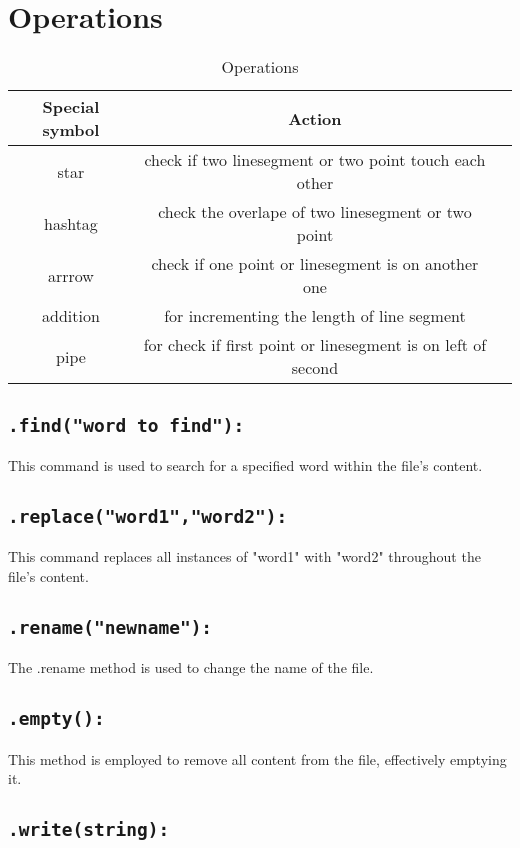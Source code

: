 \documentclass{article}
\begin{document}
\section{Operations}
\begin{table}[h!]
  \centering
  \caption{Operations}
  \label{tab:Operations}
  \begin{tabular}{|c|c|c|}
  \hline
  Special symbol & Action  \\
  \hline
  star &  check if  two linesegment or two point touch each other \\
  hashtag & check the overlape of two linesegment or two point  \\
  arrrow &  check if one point or linesegment is on another one\\
  addition & for incrementing the length of line segment \\
  pipe & for check if first point or linesegment is on left of second \\
  \hline
  \end{tabular}
  \end{table}

\subsection{\texttt{.find("word to find"):}}

This command is used to search for a specified word within the file's content.
\subsection{\texttt{.replace("word1","word2"):}}

This command replaces all instances of "word1" with "word2" throughout the file's content.
\subsection{\texttt{.rename("newname"):}}

The .rename method is used to change the name of the file.
\subsection{\texttt{.empty():}}

This method is employed to remove all content from the file, effectively emptying it.
\subsection{\texttt{.write(string):}}
\end{document}
